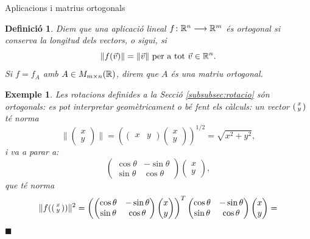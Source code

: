 \documentclass[
  11pt,
]{book}
\makeatletter
\numberwithin{dummy}{section}
\theoremstyle{maincolornumbox}
\theoremstyle{blacknumex}
\newtheorem{exampleT}{Exemple}[chapter]
\theoremstyle{blacknumbox}
\newtheorem{definitionT}{Definició}[chapter]
\theoremstyle{maincolornum}
\newenvironment{definition}{\begin{dBox}\begin{definitionT}}{\end{definitionT}\end{dBox}}
\newenvironment{example}{\begin{exampleT}}{\hfill{\tiny\ensuremath{\blacksquare}}\end{exampleT}}
\renewcommand{\section}{\@startsection{section}{1}{\z@}
{-4ex \@plus -1ex \@minus -.4ex}
{1ex \@plus.2ex }
{\normalfont\large\sffamily\bfseries}}
\makeatother
\begin{document}
\section{Aplicacions i matrius ortogonals}\label{aplicacions-i-matrius-ortogonals}

\begin{definition}
Diem que una aplicació lineal \(f \colon \mathbb{R}^n\longrightarrow \mathbb{R}^m\) és \emph{ortogonal} si
conserva la longitud dels vectors, o sigui, si
\[\|f(\vec v)\|=\|\vec v\| \text{ per a tot $\vec v\in\mathbb{R}^n$.}\] Si
\(f=f_A\) amb \(A\in M_{m\times n}(\mathbb{R})\), direm que \(A\) és una \emph{matriu
ortogonal}.
\end{definition}

\begin{example}
Les rotacions definides a la Secció
\ref{subsubsec:rotacio} són ortogonals: es pot interpretar
geomètricament o bé fent els càlculs: un vector \(\left(\begin{smallmatrix}x\\y\end{smallmatrix}\right)\) té norma
\[\|\begin{pmatrix}x \\ y \end{pmatrix}\|=\left(\begin{pmatrix} x & y \end{pmatrix}\begin{pmatrix} x \\ y \end{pmatrix}\right)^{1/2} = \sqrt{x^2+y^2},\]
i va a parar a: \[\begin{pmatrix}
\cos\theta&-\sin\theta\\
\sin\theta&\cos\theta
\end{pmatrix}
\begin{pmatrix}x \\ y \end{pmatrix} ,\] que té norma \begin{align*}
\|f(\smat{x\\y})\|^2 & =\left( \begin{pmatrix}
\cos\theta&-\sin\theta\\
\sin\theta&\cos\theta
\end{pmatrix}
\begin{pmatrix}x \\ y \end{pmatrix}  \right)^T
\begin{pmatrix}
\cos\theta&-\sin\theta\\
\sin\theta&\cos\theta
\end{pmatrix}
\begin{pmatrix}x \\ y \end{pmatrix} = \\

\end{align*}
\end{example}
\end{document}

